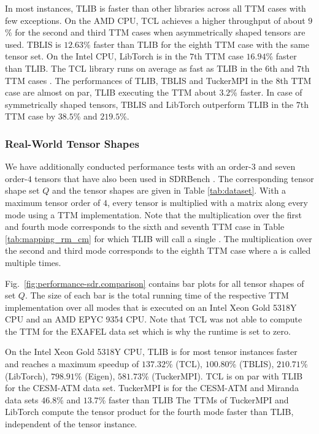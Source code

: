 In most instances, TLIB is faster than other libraries across all TTM cases with few exceptions.
On the AMD CPU, TCL achieves a higher throughput of about $9$\% for the second and third TTM cases when asymmetrically shaped tensors are used.
TBLIS is $12.63$\% faster than TLIB for the eighth TTM case with the same tensor set.
On the Intel CPU, LibTorch is in the $7$th TTM case $16.94$\% faster than TLIB.
The TCL library runs on average as fast as TLIB in the $6$th and $7$th TTM cases .
The performances of TLIB, TBLIS and TuckerMPI in the $8$th TTM case are almost on par, TLIB executing the TTM about $3.2$\% faster.
In case of symmetrically shaped tensors, TBLIS and LibTorch outperform TLIB in the $7$th TTM case by $38.5$\% and $219.5$\%.


\subsubsection{Real-World Tensor Shapes}
We have additionally conducted performance tests with an order-$3$ and seven order-$4$ tensors that have also been used in SDRBench \cite{zhao:2020:sdrbench}.
The corresponding tensor shape set $Q$ and the tensor shapes are given in Table \ref{tab:dataset}.
With a maximum tensor order of $4$, every tensor is multiplied with a matrix along every mode using a TTM implementation.
Note that the multiplication over the first and fourth mode corresponds to the sixth and seventh TTM case in Table \ref{tab:mapping_rm_cm} for which TLIB will call a single .
The multiplication over the second and third mode corresponds to the eighth TTM case where a  is called multiple times.

Fig.~\ref{fig:performance-sdr.comparison} contains bar plots for all tensor shapes of set $Q$.
The size of each bar is the total running time of the respective TTM implementation over all modes that is executed on an Intel Xeon Gold 5318Y CPU and an AMD EPYC 9354 CPU.
Note that TCL was not able to compute the TTM for the EXAFEL data set which is why the runtime is set to zero.

On the Intel Xeon Gold 5318Y CPU, TLIB is for most tensor instances faster and reaches a maximum speedup of $137.32$\% (TCL), $100.80$\% (TBLIS), $210.71$\% (LibTorch), $798.91$\% (Eigen), $581.73$\% (TuckerMPI).
TCL is on par with TLIB for the CESM-ATM data set.
TuckerMPI is for the CESM-ATM and Miranda data sets $46.8$\% and $13.7$\% faster than TLIB 
The TTMs of TuckerMPI and LibTorch compute the tensor product for the fourth mode faster than TLIB, independent of the tensor instance.

